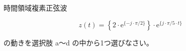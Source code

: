 時間領域複素正弦波

\[
z(t) =  \left \{ 2 \cdot \textrm{e}^{\{-j \cdot \pi/2 \}} \right \} \cdot \textrm{e}^{\{ j \cdot \pi/5 \cdot t \}}
\]

\medskip
\noindent の動きを選択肢 a〜d の中から1つ選びなさい。
